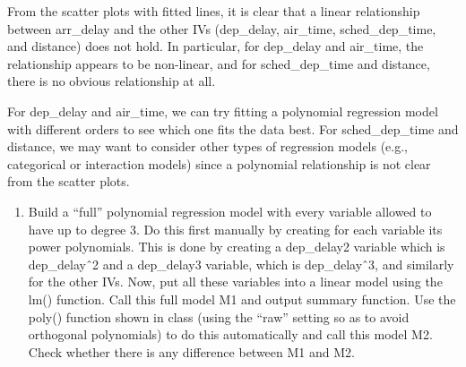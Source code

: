 \documentclass[
]{article}
\providecommand{\tightlist}{%
  \setlength{\itemsep}{0pt}\setlength{\parskip}{0pt}}
\begin{document}
From the scatter plots with fitted lines, it is clear that a linear
relationship between arr\_delay and the other IVs (dep\_delay,
air\_time, sched\_dep\_time, and distance) does not hold. In particular,
for dep\_delay and air\_time, the relationship appears to be non-linear,
and for sched\_dep\_time and distance, there is no obvious relationship
at all.

For dep\_delay and air\_time, we can try fitting a polynomial regression
model with different orders to see which one fits the data best. For
sched\_dep\_time and distance, we may want to consider other types of
regression models (e.g., categorical or interaction models) since a
polynomial relationship is not clear from the scatter plots.

\begin{enumerate}
\def\labelenumi{\alph{enumi}.}
\setcounter{enumi}{2}
\tightlist
\item
  Build a ``full'' polynomial regression model with every variable
  allowed to have up to degree 3. Do this first manually by creating for
  each variable its power polynomials. This is done by creating a
  dep\_delay2 variable which is dep\_delayˆ2 and a dep\_delay3 variable,
  which is dep\_delayˆ3, and similarly for the other IVs. Now, put all
  these variables into a linear model using the lm() function. Call this
  full model M1 and output summary function. Use the poly() function
  shown in class (using the ``raw'' setting so as to avoid orthogonal
  polynomials) to do this automatically and call this model M2. Check
  whether there is any difference between M1 and M2.
\end{enumerate}
\end{document}
